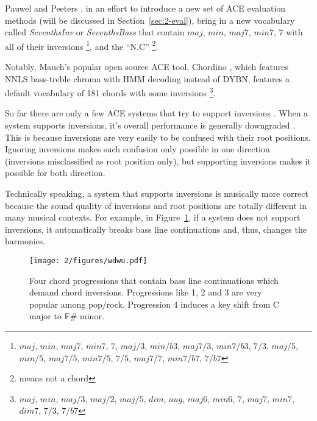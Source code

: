 Pauwel and Peeters \cite{pauwels2013evaluating}, in an effort to introduce a new set of ACE evaluation methods (will be discussed in Section~\ref{sec:2-eval}), bring in a new vocabulary called \textit{SeventhsInv} or \textit{SeventhsBass} that contain $maj$, $min$, $maj7$, $min7$, $7$ with all of their inversions \footnote{$maj$, $min$, $maj7$, $min7$, $7$, $maj/3$, $min/b3$, $maj7/3$, $min7/b3$, $7/3$, $maj/5$, $min/5$, $maj7/5$, $min7/5$, $7/5$, $maj7/7$, $min7/b7$, $7/b7$}, and the ``N.C'' \footnote{means not a chord}.

Notably, Mauch's popular open source ACE tool, Chordino \cite{cannam2010sonic}, which features NNLS bass-treble chroma with HMM decoding instead of DYBN, features a default vocabulary of 181 chords with some inversions \footnote{$maj$, $min$, $maj/3$, $maj/2$, $maj/5$, $dim$, $aug$, $maj6$, $min6$, $7$, $maj7$, $min7$, $dim7$, $7/3$, $7/b7$}.


So far there are only a few ACE systems that try to support inversions \cite{cannam2010sonic,mauch2010automatic,ni2012end,mcvicar2013machine,deng2016chord,deng2016hybrid}. When a system supports inversions, it's overall performance is generally downgraded \cite{deng2016chord}. This is because inversions are very easily to be confused with their root positions. Ignoring inversions makes such confusion only possible in one direction (inversions misclassified as root position only), but supporting inversions makes it possible for both direction.

Technically speaking, a system that supports inversions is musically more correct because the sound quality of inversions and root positions are totally different in many musical contexts. For example, in Figure~\ref{fig:2-wdwu}, if a system does not support inversions, it automatically breaks bass line continuations and, thus, changes the harmonies.
\begin{figure}[htb]
\centering
\texttt{[image: 2/figures/wdwu.pdf]}
\caption{Four chord progressions that contain bass line continuations which demand chord inversions. Progressions like 1, 2 and 3 are very popular among pop/rock. Progression 4 induces a key shift from C major to F\# minor.}
\label{fig:2-wdwu}
\end{figure}

